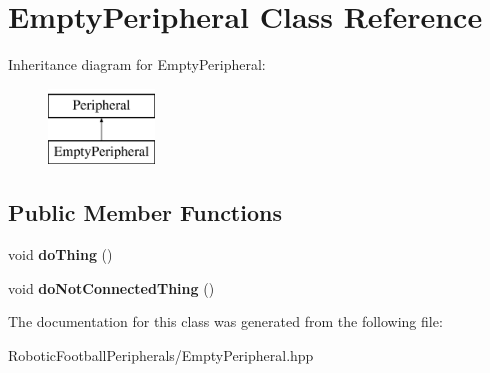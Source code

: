 \hypertarget{class_empty_peripheral}{}\section{Empty\+Peripheral Class Reference}
\label{class_empty_peripheral}
Inheritance diagram for Empty\+Peripheral\+:\begin{figure}[H]
\begin{center}
\leavevmode
\includegraphics[height=2.000000cm]{class_empty_peripheral}
\end{center}
\end{figure}
\subsection*{Public Member Functions}
\begin{DoxyCompactItemize}
\item 
\mbox{\label{class_empty_peripheral_a563da11bcb1e8b63a6472af037d1b38c}} 
void {\bfseries do\+Thing} ()
\item 
\mbox{\label{class_empty_peripheral_a9a3476c5016dd2865fcad3bd76010069}} 
void {\bfseries do\+Not\+Connected\+Thing} ()
\end{DoxyCompactItemize}


The documentation for this class was generated from the following file\+:\begin{DoxyCompactItemize}
\item 
Robotic\+Football\+Peripherals/Empty\+Peripheral.\+hpp\end{DoxyCompactItemize}
